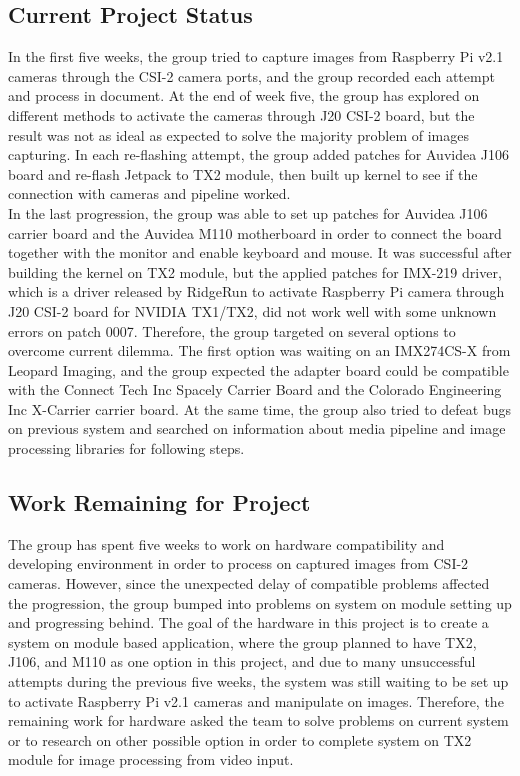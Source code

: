 \documentclass[letterpaper,10pt,serif,draftclsnofoot,onecolumn,compsoc,titlepage]{IEEEtran}
\begin{document}
\subsection{Current Project Status}

In the first five weeks, the group tried to capture images from Raspberry Pi v2.1 cameras 
through the CSI-2 camera ports, and the group recorded each attempt and process in document. 
At the end of week five, the group has explored on different methods to activate the cameras 
through J20 CSI-2 board, but the result was not as ideal as expected to solve the majority 
problem of images capturing. In each re-flashing attempt, the group added patches for Auvidea 
J106 board and re-flash Jetpack to TX2 module, then built up kernel to see if the connection 
with cameras and pipeline worked.\\

In the last progression, the group was able to set up patches for Auvidea J106 carrier board 
and the Auvidea M110 motherboard in order to connect the board together with the monitor and 
enable keyboard and mouse. It was successful after building the kernel on TX2 module, but the 
applied patches for IMX-219 driver, which is a driver released by RidgeRun to activate Raspberry 
Pi camera through J20 CSI-2 board for NVIDIA TX1/TX2, did not work well with some unknown errors 
on patch 0007. Therefore, the group targeted on several options to overcome current dilemma. The 
first option was waiting on an IMX274CS-X from Leopard Imaging, and the group expected the adapter 
board could be compatible with the Connect Tech Inc Spacely Carrier Board and the Colorado 
Engineering Inc X-Carrier carrier board. At the same time, the group also tried to defeat bugs 
on previous system and searched on information about media pipeline and image processing libraries 
for following steps.\\

\subsection{Work Remaining for Project}

The group has spent five weeks to work on hardware compatibility and developing environment in order 
to process on captured images from CSI-2 cameras. However, since the unexpected delay of compatible 
problems affected the progression, the group bumped into problems on system on module setting up and 
progressing behind. The goal of the hardware in this project is to create a system on module based 
application, where the group planned to have TX2, J106, and M110 as one option in this project, and 
due to many unsuccessful attempts during the previous five weeks, the system was still waiting to be set 
up to activate Raspberry Pi v2.1 cameras and manipulate on images. Therefore, the remaining work for 
hardware asked the team to solve problems on current system or to research on other possible option in 
order to complete system on TX2 module for image processing from video input.\\
\end{document}
